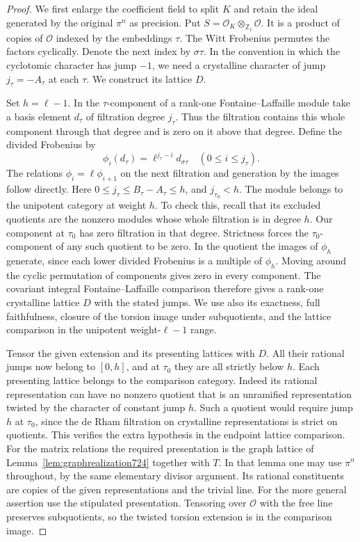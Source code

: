 \documentclass[a4paper,11pt]{article}
\theoremstyle{definition}
\theoremstyle{remark}
\newcommand{\ZZ}{\mathbb Z}\newcommand{\ord}{\operatorname{ord}}
\numberwithin{equation}{section}
\begin{document}
\begin{proof}
We first enlarge the coefficient field to split \(K\) and retain the
ideal generated by the original \(\pi^n\) as precision. Put
\(S=\mathcal O_K\otimes_{\ZZ_\ell}\mathcal O\).
It is a product of copies of \(\mathcal O\) indexed by the
embeddings \(\tau\). The Witt Frobenius permutes the factors
cyclically. Denote the next index by \(\sigma\tau\).
In the convention in which the cyclotomic character has jump
\(-1\), we need a crystalline character of jump \(j_\tau=-A_\tau\)
at each \(\tau\). We construct its lattice \(D\).

Set \(h=\ell-1\). In the \(\tau\)-component of a rank-one
Fontaine--Laffaille module take a basis element \(d_\tau\) of
filtration degree \(j_\tau\). Thus the filtration contains this
whole component through that degree and is zero on it above that
degree. Define the divided Frobenius by
\[
       \phi_i(d_\tau)=\ell^{j_\tau-i}d_{\sigma\tau}
                           \quad(0\le i\le j_\tau).
\]
The relations \(\phi_i=\ell\phi_{i+1}\) on the next filtration
and generation by the images follow directly. Here \(0\le
j_\tau\le B_\tau-A_\tau\le h\), and \(j_{\tau_0}<h\).
The module belongs to the unipotent category at weight \(h\).
To check this, recall that its excluded quotients are the
nonzero modules whose whole filtration is in degree \(h\).
Our component at \(\tau_0\) has zero filtration in that degree.
Strictness forces the \(\tau_0\)-component of any such quotient
to be zero. In the quotient the images of \(\phi_h\) generate,
since each lower divided Frobenius is a multiple of \(\phi_h\).
Moving around the cyclic permutation of components gives zero in
every component. The covariant integral Fontaine--Laffaille
comparison therefore gives a rank-one crystalline lattice \(D\)
with the stated jumps. We use also its exactness, full faithfulness,
closure of the torsion image under subquotients, and the lattice
comparison in the unipotent weight-\(\ell-1\) range.
~\cite[\S2.3]{II-II-II-ghls724}

Tensor the given extension and its presenting lattices with \(D\).
All their rational jumps now belong to \([0,h]\), and at \(\tau_0\)
they are all strictly below \(h\). Each presenting lattice belongs
to the comparison category. Indeed its rational representation
can have no nonzero quotient that is an unramified representation
twisted by the character of constant jump \(h\). Such a quotient
would require jump \(h\) at \(\tau_0\), since the de Rham filtration
on crystalline representations is strict on quotients. This verifies
the extra hypothesis in the endpoint lattice comparison. For the
matrix relations the required presentation is the graph lattice
of Lemma~\ref{lem:graphrealization724} together with \(T\). In that
lemma one may use \(\pi^n\) throughout, by the same elementary
divisor argument. Its rational constituents are copies of the given
representations and the trivial line. For the more general assertion
use the stipulated presentation. Tensoring over \(\mathcal O\)
with the free line preserves subquotients, so the twisted torsion
extension is in the comparison image.


\end{proof}
\end{document}
